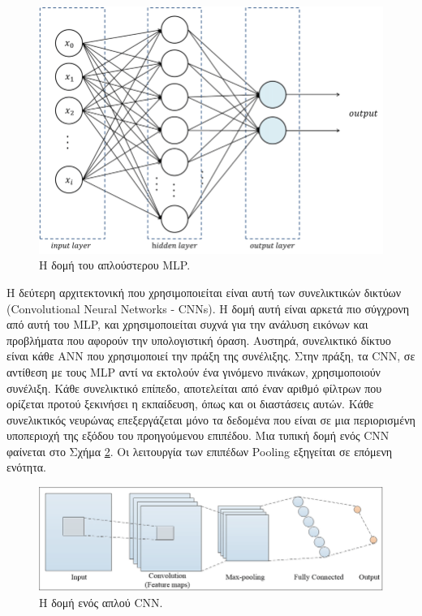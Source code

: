 \begin{figure}[h]
  \centering
  \includegraphics[width=\textwidth]{images/multilayer-perceptron.png}
  \caption{Η δομή του απλούστερου MLP.}
  \label{fig:multilayer-perceptron}
\end{figure}

Η δεύτερη αρχιτεκτονική που χρησιμοποιείται είναι αυτή των συνελικτικών δικτύων (Convolutional Neural Networks - CNNs). Η δομή αυτή είναι αρκετά πιο σύγχρονη από αυτή του MLP, και χρησιμοποιείται συχνά για την ανάλυση εικόνων και προβλήματα που αφορούν την υπολογιστική όραση. Αυστηρά, συνελικτικό δίκτυο είναι κάθε ANN που χρησιμοποιεί την πράξη της συνέλιξης. Στην πράξη, τα CNN, σε αντίθεση με τους MLP αντί να εκτολούν ένα γινόμενο πινάκων, χρησιμοποιούν συνέλιξη. Κάθε συνελικτικό επίπεδο, αποτελείται από έναν αριθμό φίλτρων που ορίζεται προτού ξεκινήσει η εκπαίδευση, όπως και οι διαστάσεις αυτών. Κάθε συνελικτικός νευρώνας επεξεργάζεται μόνο τα δεδομένα που είναι σε μια περιορισμένη υποπεριοχή της εξόδου του προηγούμενου επιπέδου. Μια τυπική δομή ενός CNN φαίνεται στο Σχήμα \ref{fig:convolutional-neural-network-architecture}. Οι λειτουργία των επιπέδων Pooling εξηγείται σε επόμενη ενότητα.

\begin{figure}[h]
  \centering
  \includegraphics[width=\textwidth]{images/convolutional-neural-network-architecture-showing-a-feed-forward-pass-with-one.png}
  \caption{Η δομή ενός απλού CNN.}
  \label{fig:convolutional-neural-network-architecture}
\end{figure}
\newpage
